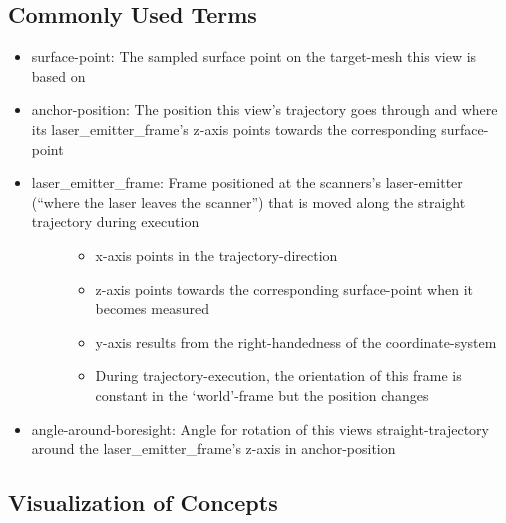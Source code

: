 \documentclass[letterpaper,10pt,english]{sphinxmanual}
\begin{document}
\subsection{Commonly Used Terms}
\label{\detokenize{module_view:commonly-used-terms}}\begin{itemize}
\item {} 
surface-point: The sampled surface point on the target-mesh this view is based on

\item {} 
anchor-position: The position this view’s trajectory goes through and where its laser\_emitter\_frame’s z-axis points towards the corresponding surface-point

\item {} \begin{description}
\item[{laser\_emitter\_frame: Frame positioned at the scanners’s laser-emitter (“where the laser leaves the scanner”) that is moved along the straight trajectory during execution}] \leavevmode\begin{itemize}
\item {} 
x-axis points in the trajectory-direction

\item {} 
z-axis points towards the corresponding surface-point when it becomes measured

\item {} 
y-axis results from the right-handedness of the coordinate-system

\item {} 
During trajectory-execution, the orientation of this frame is constant in the ‘world’-frame but the position changes

\end{itemize}

\end{description}

\item {} 
angle-around-boresight: Angle for rotation of this views straight-trajectory around the laser\_emitter\_frame’s z-axis in anchor-position

\end{itemize}


\subsection{Visualization of Concepts}
\label{\detokenize{module_view:visualization-of-concepts}}
\begin{figure}[htbp]
\centering

\noindent{}
\end{figure}
\end{document}
